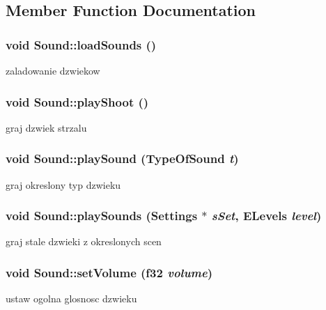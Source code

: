 \subsection{Member Function Documentation}
\hypertarget{class_sound_a546cbcbe1daf58877604aed9ec020b3e}{
\subsubsection[{loadSounds}]{\setlength{\rightskip}{0pt plus 5cm}void Sound::loadSounds ()}}
\label{class_sound_a546cbcbe1daf58877604aed9ec020b3e}
zaladowanie dzwiekow \hypertarget{class_sound_a4cb3a0ff7fb89b3267cc1d0e7abec829}{
\subsubsection[{playShoot}]{\setlength{\rightskip}{0pt plus 5cm}void Sound::playShoot ()}}
\label{class_sound_a4cb3a0ff7fb89b3267cc1d0e7abec829}
graj dzwiek strzalu \hypertarget{class_sound_a8827c2786f9323a93a250ab9872a7d87}{
\subsubsection[{playSound}]{\setlength{\rightskip}{0pt plus 5cm}void Sound::playSound (TypeOfSound {\em t})}}
\label{class_sound_a8827c2786f9323a93a250ab9872a7d87}
graj okreslony typ dzwieku \hypertarget{class_sound_a73e9a5469bd02743280cbc139e02a26c}{
\subsubsection[{playSounds}]{\setlength{\rightskip}{0pt plus 5cm}void Sound::playSounds ({\bf Settings} $\ast$ {\em sSet}, \/  ELevels {\em level})}}
\label{class_sound_a73e9a5469bd02743280cbc139e02a26c}
graj stale dzwieki z okreslonych scen \hypertarget{class_sound_a214b10b071c25751d4676880e5ce824d}{
\subsubsection[{setVolume}]{\setlength{\rightskip}{0pt plus 5cm}void Sound::setVolume (f32 {\em volume})}}
\label{class_sound_a214b10b071c25751d4676880e5ce824d}
ustaw ogolna glosnosc dzwieku 

